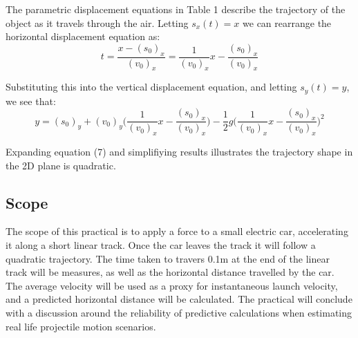 \documentclass[a4paper]{article}
\begin{document}
The parametric displacement equations in Table 1 describe the trajectory of the object as it travels through the air. Letting $s_x(t) = x$ we can rearrange the horizontal displacement equation as:
\begin{equation}
t = \frac{x - (s_0)_x}{(v_0)_x} = \frac{1}{(v_0)_x}x - \frac{(s_0)_x}{(v_0)_x}
\end{equation}

Substituting this into the vertical displacement equation, and letting $s_y(t) = y$, we see that:
\begin{equation}
y = (s_0)_y + (v_0)_y \bigg(\frac{1}{(v_0)_x}x - \frac{(s_0)_x}{(v_0)_x} \bigg) -\frac{1}{2}g \bigg(\frac{1}{(v_0)_x}x - \frac{(s_0)_x}{(v_0)_x} \bigg)^2
\end{equation}

Expanding equation (7) and simplifiying results illustrates the trajectory shape in the 2D plane is quadratic.


\subsection{Scope}
The scope of this practical is to apply a force to a small electric car, accelerating it along a short linear track. Once the car leaves the track it will follow a quadratic trajectory. The time taken to travers 0.1$\si{\meter}$ at the end of the linear track will be measures, as well as the horizontal distance travelled by the car. The average velocity will be used as a proxy for instantaneous launch velocity, and a predicted horizontal distance will be calculated. The practical will conclude with a discussion around the reliability of predictive calculations when estimating real life projectile motion scenarios.

\newpage
\end{document}

